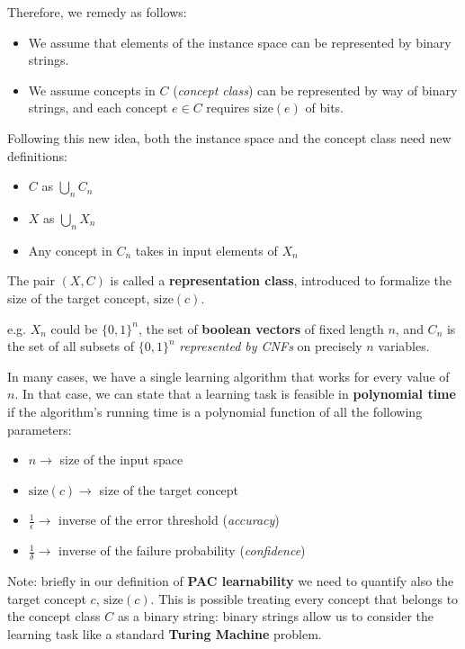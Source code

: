 Therefore, we remedy as follows:
\begin{itemize}
    \renewcommand{\labelitemi}{-}
    \item We assume that elements of the instance space can be represented by binary strings.
    \item We assume concepts in $C$ (\textit{concept class}) can be represented by way of binary strings, and each concept $e \in C$ requires $\text{size}(e)$ of bits.
\end{itemize}
Following this new idea, both the instance space and the concept class need new definitions:
\begin{itemize}
    \renewcommand{\labelitemi}{-}
    \item $C$ as $\bigcup_n C_n$
    \item $X$ as $\bigcup_n X_n$
    \item Any concept in $C_n$ takes in input elements of $X_n$
\end{itemize}
The pair $(X, C)$ is called a \textbf{representation class}, introduced to formalize the size of the target concept, $\text{size}(c)$.
\begin{example}
    e.g. $X_n$ could be $\{0,1\}^n$, the set of \textbf{boolean vectors} of fixed length $n$, and $C_n$ is the set of all subsets of $\{0,1\}^n$ \textit{represented
    by CNFs} on precisely $n$ variables.
\end{example} \vspace{7pt}
In many cases, we have a single learning algorithm that works for every value of $n$. In that case, we can state that a learning task is feasible in 
\textbf{polynomial time} if the algorithm's running time is a polynomial function of all the following parameters:
\begin{itemize}
    \renewcommand{\labelitemi}{-}
    \item $n \rightarrow$ size of the input space
    \item $\text{size}(c) \rightarrow$ size of the target concept
    \item $\frac{1}{\epsilon} \rightarrow$ inverse of the error threshold (\textit{accuracy})
    \item $\frac{1}{\delta} \rightarrow$ inverse of the failure probability (\textit{confidence})
\end{itemize}

Note: briefly in our definition of \textbf{PAC learnability} we need to quantify also the target concept $c$, $\text{size}(c)$. This is possible treating every 
concept that belongs to the concept class $C$ as a binary string: binary strings allow us to consider the learning task like a standard \textbf{Turing Machine}
problem.
